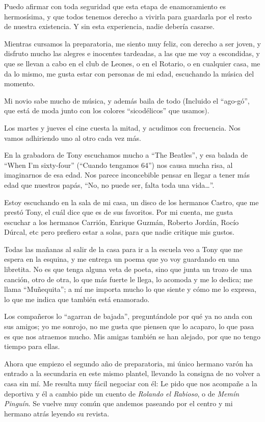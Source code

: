 \documentclass[letterpaper, 12pt]{book}
\begin{document}
Puedo afirmar con toda seguridad que esta etapa de enamoramiento es hermosísima, y que todos tenemos derecho a vivirla para guardarla por el resto de nuestra existencia. Y sin esta experiencia, nadie debería casarse.

Mientras cursamos la preparatoria, me siento muy feliz, con derecho a ser joven, y disfruto mucho las alegres e inocentes tardeadas, a las que me voy a escondidas, y que se llevan a cabo en el club de Leones, o en el Rotario, o en cualquier casa, me da lo mismo, me gusta estar con personas de mi edad, escuchando la música del momento. 

Mi novio sabe mucho de música, y además baila de todo (Incluido el  ``ago-gó'', que está de moda junto con los colores ``sicodélicos'' que usamos).

Los martes y jueves el cine cuesta la mitad, y acudimos con frecuencia. Nos vamos adhiriendo uno al otro cada vez más.

En la grabadora de Tony escuchamos mucho a ``The Beatles'', y esa balada de ``When I'm sixty-four'' (``Cuando tengamos 64'') nos causa mucha risa, al imaginarnos de esa edad. Nos parece inconcebible pensar en llegar a tener más edad que nuestros papás, ``No, no puede ser, falta toda una vida\ldots''.

Estoy escuchando en la sala de mi casa, un disco de los hermanos Castro, que me prestó Tony, el cuál dice que es de sus favoritos. Por mi cuenta, me gusta escuchar a los hermanos Carrión, Enrique Guzmán, Roberto Jordán, Rocío Dúrcal, etc pero prefiero estar a solas, para que nadie critique mis gustos.

Todas las mañanas al salir de la casa para ir a la escuela veo a Tony que me espera en la esquina, y me entrega un poema que yo voy guardando en una libretita. No es que tenga alguna veta de poeta, sino que junta un trozo de una canción, otro de otra, lo que más fuerte le llega, lo acomoda y me lo dedica; me llama ``Muñequita''; a mí me importa mucho lo que siente y cómo me lo expresa, lo que me indica que también está enamorado.

Los compañeros lo ``agarran de bajada'', preguntándole por qué ya no anda con sus amigos; yo me sonrojo, no me gusta que piensen que lo acaparo, lo que pasa es que nos atraemos mucho. Mis amigas también se han alejado, por que no tengo tiempo para ellas. 

Ahora que empiezo el segundo año de preparatoria, mi único hermano varón ha entrado a la secundaria en este mismo plantel, llevando la consigna de no volver a casa sin mí. Me resulta muy fácil negociar con él: Le pido que nos acompañe a la deportiva y él a cambio pide un cuento de \textit{Rolando el Rabioso}, o de \textit{Memín Pinguín}. Se vuelve muy común que andemos paseando por el centro y mi hermano atrás leyendo su revista.
\end{document}
